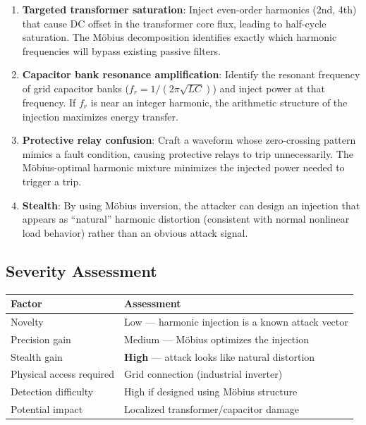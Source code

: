 \documentclass[11pt,a4paper]{article}
\begin{document}
\begin{enumerate}
  \item \textbf{Targeted transformer saturation}: Inject
    even-order harmonics (2nd, 4th) that cause DC offset in the
    transformer core flux, leading to half-cycle saturation.
    The M\"obius decomposition identifies exactly which harmonic
    frequencies will bypass existing passive filters.

  \item \textbf{Capacitor bank resonance amplification}: Identify
    the resonant frequency of grid capacitor banks
    ($f_r = 1/(2\pi\sqrt{LC})$) and inject power at that frequency.
    If $f_r$ is near an integer harmonic, the arithmetic structure
    of the injection maximizes energy transfer.

  \item \textbf{Protective relay confusion}: Craft a waveform whose
    zero-crossing pattern mimics a fault condition, causing
    protective relays to trip unnecessarily. The M\"obius-optimal
    harmonic mixture minimizes the injected power needed to trigger
    a trip.

  \item \textbf{Stealth}: By using M\"obius inversion, the attacker
    can design an injection that appears as ``natural'' harmonic
    distortion (consistent with normal nonlinear load behavior)
    rather than an obvious attack signal.
\end{enumerate}

\subsection{Severity Assessment}

\begin{center}
\begin{tabular}{@{}ll@{}}
\toprule
\textbf{Factor} & \textbf{Assessment} \\
\midrule
Novelty & Low --- harmonic injection is a known attack vector \\
Precision gain & Medium --- M\"obius optimizes the injection \\
Stealth gain & \textbf{High} --- attack looks like natural distortion \\
Physical access required & Grid connection (industrial inverter) \\
Detection difficulty & High if designed using M\"obius structure \\
Potential impact & Localized transformer/capacitor damage \\
\bottomrule
\end{tabular}
\end{center}
\end{document}
